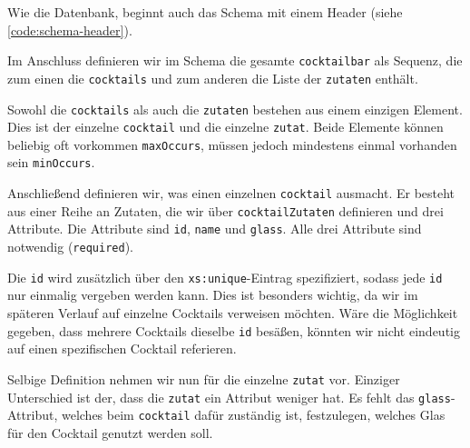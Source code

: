 Wie die Datenbank, beginnt auch das Schema mit einem Header (siehe \ref{code:schema-header}).








Im Anschluss definieren wir im Schema die gesamte \texttt{cocktailbar} als Sequenz, die zum einen die \texttt{cocktails} und zum anderen die Liste der \texttt{zutaten} enthält.








Sowohl die \texttt{cocktails} als auch die \texttt{zutaten} bestehen aus einem einzigen Element. Dies ist der einzelne \texttt{cocktail} und die einzelne \texttt{zutat}. Beide Elemente können beliebig oft vorkommen \texttt{maxOccurs}, müssen jedoch mindestens einmal vorhanden sein \texttt{minOccurs}.








Anschließend definieren wir, was einen einzelnen \texttt{cocktail} ausmacht. Er besteht aus einer Reihe an Zutaten, die wir über \texttt{cocktailZutaten} definieren und drei Attribute. Die Attribute sind \texttt{id}, \texttt{name} und \texttt{glass}. Alle drei Attribute sind notwendig (\texttt{required}).

Die \texttt{id} wird zusätzlich über den \texttt{xs:unique}-Eintrag spezifiziert, sodass jede \texttt{id} nur einmalig vergeben werden kann. Dies ist besonders wichtig, da wir im späteren Verlauf auf einzelne Cocktails verweisen möchten. Wäre die Möglichkeit gegeben, dass mehrere Cocktails dieselbe \texttt{id} besäßen, könnten wir nicht eindeutig auf einen spezifischen Cocktail referieren.








Selbige Definition nehmen wir nun für die einzelne \texttt{zutat} vor. Einziger Unterschied ist der, dass die \texttt{zutat} ein Attribut weniger hat. Es fehlt das \texttt{glass}-Attribut, welches beim \texttt{cocktail} dafür zuständig ist, festzulegen, welches Glas für den Cocktail genutzt werden soll.

